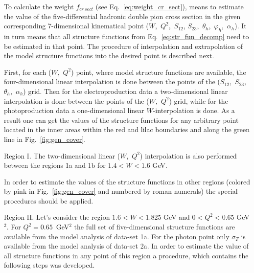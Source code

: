 To  calculate the weight $f_{cr~sect}$ (see Eq.~\eqref{eq:weight_cr_sect}), means to estimate the value of the five-differential hadronic double pion cross section in the given corresponding 7-dimensional kinematical point ($W$,~$Q^2$,~$S_{12}$, $S_{23}$,~$\theta_{h}$,~$\varphi_{h}$,~$\alpha_{h}$). It in turn means that all structure functions from Eq.~\eqref{eq:str_fun_decomp} need to be estimated in that point.  The procedure of interpolation and extrapolation of the model structure functions into the desired point is described next. 


First, for each ($W$,~$Q^2$) point, where model structure functions are available, the four-dimensional linear interpolation is done between the points of the ($S_{12}$,~$S_{23}$,~$\theta_{h}$,~$\alpha_{h}$) grid. Then for the electroproduction data a two-dimensional linear interpolation is done between the points of the ($W$,~$Q^2$) grid, while for the photoproduction data a one-dimensional linear $W$-interpolation is done. As a result one can get the values of the structure functions for any arbitrary point located in the inner areas within the red and lilac boundaries and along the green line in Fig.~\ref{fig:gen_cover}. 

Region I. The two-dimensional linear ($W$,~$Q^2$) interpolation is also performed between the regions 1a and 1b for $1.4 < W < 1.6$ GeV. 

In order to estimate the values of the structure functions in other regions (colored by pink in Fig.~\ref{fig:gen_cover} and numbered by roman numerals) the special procedures should be applied.

Region II. Let's consider the region $1.6 < W < 1.825$ GeV and $0 < Q^2 < 0.65$ GeV$^2$. For $Q^2 = 0.65$~GeV$^2$ the full set of five-dimensional structure functions are available from the model analysis of data-set 1a. For the photon point only $\sigma_{T}$ is available from the model analysis of data-set 2a. In order to estimate the value of all structure functions in any point of this region a procedure, which contains the following steps was developed.

